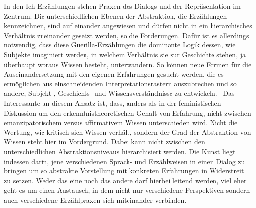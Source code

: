 \noindent In den Ich-Erzählungen stehen Praxen des Dialogs und der Repräsentation im
Zentrum. Die unterschiedlichen Ebenen der Abstraktion, die Erzählungen
kennzeichnen, sind auf einander angewiesen und dürfen nicht in ein
hierarchisches Verhältnis zueinander gesetzt werden, so die Forderungen. Dafür
ist es allerdings notwendig, dass diese Guerilla-Erzählungen die dominante Logik
dessen, wie Subjekte imaginiert werden, in welchem Verhältnis sie zur Geschichte
stehen, ja überhaupt woraus Wissen besteht, unterwandern. So können neue Formen
für die Auseinandersetzung mit den eigenen Erfahrungen gesucht werden, die es
ermöglichen aus einschneidenden Interpretationsrastern auszubrechen und so
andere, Subjekt-, Geschichts- und Wissensverständnisse zu entwickeln. \
Das
Interessante an diesem Ansatz ist, dass, anders als in der feministischen
Diskussion um den erkenntnistheoretischen Gehalt von Erfahrung, nicht zwischen
emanzipatorischem versus affirmativem Wissen unterschieden wird. Nicht die
Wertung, wie kritisch sich Wissen verhält, sondern der Grad der Abstraktion von
Wissen steht hier im Vordergrund. Dabei kann nicht zwischen den
unterschiedlichen Abstraktionsniveaus hierarchisiert werden. Die Kunst liegt
indessen darin, jene verschiedenen Sprach- und Erzählweisen in einen Dialog zu
bringen um so abstrakte Vorstellung mit konkreten Erfahrungen in Widerstreit zu
setzen. Weder das eine noch das andere darf hierbei leitend werden, viel eher
geht es um einen Austausch, in dem nicht nur verschiedene Perspektiven sondern
auch verschiedene Erzählpraxen sich miteinander verbinden.\\

